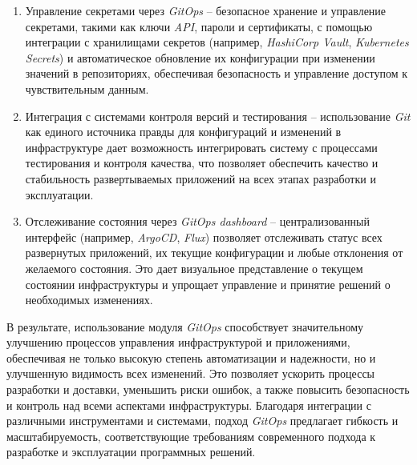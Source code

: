 \begin{enumerate}
    \item Управление секретами через \textit{GitOps} -- безопасное хранение и управление секретами, такими как ключи \textit{API}, пароли и сертификаты, с помощью интеграции с хранилищами секретов (например, \textit{HashiCorp Vault}, \textit{Kubernetes Secrets}) и автоматическое обновление их конфигурации при изменении значений в репозиториях, обеспечивая безопасность и управление доступом к чувствительным данным.
    \item Интеграция с системами контроля версий и тестирования -- использование \textit{Git} как единого источника правды для конфигураций и изменений в инфраструктуре дает возможность интегрировать систему с процессами тестирования и контроля качества, что позволяет обеспечить качество и стабильность развертываемых приложений на всех этапах разработки и эксплуатации.
    \item Отслеживание состояния через \textit{GitOps dashboard} -- централизованный интерфейс (например, \textit{ArgoCD}, \textit{Flux}) позволяет отслеживать статус всех развернутых приложений, их текущие конфигурации и любые отклонения от желаемого состояния. Это дает визуальное представление о текущем состоянии инфраструктуры и упрощает управление и принятие решений о необходимых изменениях.
\end{enumerate}

В результате, использование модуля \textit{GitOps} способствует значительному улучшению процессов управления инфраструктурой и приложениями, обеспечивая не только высокую степень автоматизации и надежности, но и улучшенную видимость всех изменений. Это позволяет ускорить процессы разработки и доставки, уменьшить риски ошибок, а также повысить безопасность и контроль над всеми аспектами инфраструктуры. Благодаря интеграции с различными инструментами и системами, подход \textit{GitOps} предлагает гибкость и масштабируемость, соответствующие требованиям современного подхода к разработке и эксплуатации программных решений.